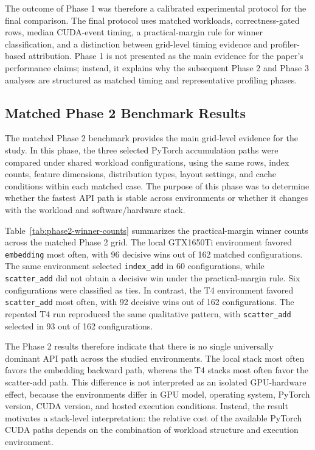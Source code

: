 The outcome of Phase 1 was therefore a calibrated experimental protocol for the final comparison. The final protocol uses matched workloads, correctness-gated rows, median CUDA-event timing, a practical-margin rule for winner classification, and a distinction between grid-level timing evidence and profiler-based attribution. Phase 1 is not presented as the main evidence for the paper's performance claims; instead, it explains why the subsequent Phase 2 and Phase 3 analyses are structured as matched timing and representative profiling phases.

\subsection{Matched Phase 2 Benchmark Results}

The matched Phase 2 benchmark provides the main grid-level evidence for the study. In this phase, the three selected PyTorch accumulation paths were compared under shared workload configurations, using the same rows, index counts, feature dimensions, distribution types, layout settings, and cache conditions within each matched case. The purpose of this phase was to determine whether the fastest API path is stable across environments or whether it changes with the workload and software/hardware stack.

Table~\ref{tab:phase2-winner-counts} summarizes the practical-margin winner counts across the matched Phase 2 grid. The local GTX1650Ti environment favored \texttt{embedding} most often, with 96 decisive wins out of 162 matched configurations. The same environment selected \texttt{index\_add} in 60 configurations, while \texttt{scatter\_add} did not obtain a decisive win under the practical-margin rule. Six configurations were classified as ties. In contrast, the T4 environment favored \texttt{scatter\_add} most often, with 92 decisive wins out of 162 configurations. The repeated T4 run reproduced the same qualitative pattern, with \texttt{scatter\_add} selected in 93 out of 162 configurations.



The Phase 2 results therefore indicate that there is no single universally dominant API path across the studied environments. The local stack most often favors the embedding backward path, whereas the T4 stacks most often favor the scatter-add path. This difference is not interpreted as an isolated GPU-hardware effect, because the environments differ in GPU model, operating system, PyTorch version, CUDA version, and hosted execution conditions. Instead, the result motivates a stack-level interpretation: the relative cost of the available PyTorch CUDA paths depends on the combination of workload structure and execution environment.

